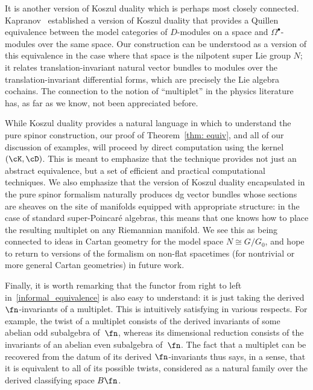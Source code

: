 \documentclass[10pt,a4paper]{amsart}
\numberwithin{equation}{section}
\def\bu{\bullet}
\begin{document}
It is another version of Koszul duality which is perhaps most closely connected. Kapranov~\cite{Kapranov} established a version of Koszul duality that provides a Quillen equivalence between the model categories of $D$-modules on a space and $\Omega^\bu$-modules over the same space. Our construction can be understood as a version of this equivalence in the case where that space is the nilpotent super Lie group $N$; it relates translation-invariant natural vector bundles to modules over the translation-invariant differential forms, which are precisely the Lie algebra cochains. The connection to the notion of ``multiplet'' in the physics literature has, as far as we know, not been appreciated before.

\begin{rmk}
	While Koszul duality provides a natural language in which to understand the pure spinor construction, our proof of Theorem~\ref{thm: equiv}, and all of our discussion of examples, will proceed by direct computation using the kernel $(\cK,\cD)$. This is meant to emphasize that the technique provides not just an abstract equivalence, but a set of efficient and practical computational techniques.
	We also emphasize that the version of Koszul duality encapsulated in the pure spinor formalism naturally produces dg vector bundles whose sections are sheaves on the site of manifolds equipped with appropriate structure: in the case of standard super-Poincar\'e algebras, this means that one knows how to place the resulting multiplet on any Riemannian manifold. We see this as being connected to ideas in Cartan geometry for the model space $N \cong G/G_0$, and hope to return to versions of the formalism on non-flat spacetimes (for nontrivial or more general Cartan geometries) in future work.
\end{rmk}

Finally, it is worth remarking that the functor from right to left in~\eqref{informal_equivalence} is also easy to understand: it is just taking the derived $\fn$-invariants of a multiplet. This is intuitively satisfying in various respects. For example, the twist of a multiplet consists of the derived invariants of some abelian odd subalgebra of~$\fn$, whereas its dimensional reduction consists of the invariants of an abelian even subalgebra of~$\fn$. The fact that a multiplet can be recovered from the datum of its derived $\fn$-invariants thus says, in a sense, that it is equivalent to all of its possible twists, considered as a natural family over the derived classifying space $B\fn$.
\end{document}
